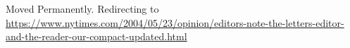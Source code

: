 Moved Permanently. Redirecting to
\url{https://www.nytimes.com/2004/05/23/opinion/editors-note-the-letters-editor-and-the-reader-our-compact-updated.html}

